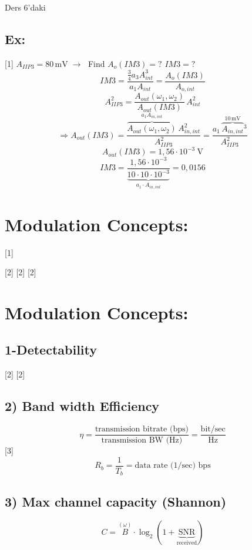 \documentclass[11pt,a4paper]{article}
\begin{document}

Ders 6'daki 
\subsection{Ex:}
[1]
$A_{IIP3} = 80\,\mathrm{mV} \;\to\;$ Find $A_o(IM3) = ?$ \qquad $IM3 = ?$
\[ IM3 = \frac{\frac34a_3A_{int}^3}{a_1A_{int}} = \frac{A_o(IM3)}{A_{o,int}} \]
\[ A_{IIP3}^2 = \frac{A_{out}(\omega_1,\omega_2)}{A_{out}(IM3)}\,A_{int}^2 \]
\[ \Rightarrow A_{out}(IM3) = \frac{\overbrace{A_{out}(\omega_1,\omega_2)}^{a_1A_{in,int}}\,A_{in,int}^2}{A_{IIP3}^2} = \frac{a_1\,\overbrace{A_{in,int}}^{10\,\mathrm{mV}}{}^{3}}{A_{IIP3}^2} \]
\[ A_{out}(IM3) = 1{,}56\cdot10^{-3}\ \mathrm{V} \]
\[ IM3 = \frac{1{,}56\cdot10^{-3}}{\underbrace{10\cdot10\cdot10^{-3}}_{a_1\cdot A_{in,int}}} = 0{,}0156 \]

\section{Modulation Concepts:}
[1]

[2]
[2]
[2]

\section{Modulation Concepts:}
\subsection{1-Detectability}
[2]
[2]

\subsection{2) Band width Efficiency}
\[ \eta = \frac{\text{transmission bitrate (bps)}}{\text{transmission BW (Hz)}} = \frac{\mathrm{bit}/\mathrm{sec}}{\mathrm{Hz}} \]
[3]
\[ R_b = \frac{1}{T_b} = \text{data rate (1/sec) bps} \]

\subsection{3) Max channel capacity (Shannon)}
\[ C = \overset{(\omega)}{B}\cdot\log_2\left(1+\underbrace{\mathrm{SNR}}_{\mathrm{received}}\right) \]
\end{document}

